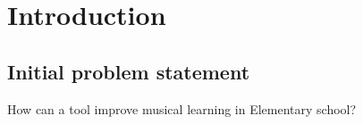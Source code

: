 \chapter{Introduction}
	
	
	
	\section{Initial problem statement}
		How can a tool improve musical learning in Elementary school?
	